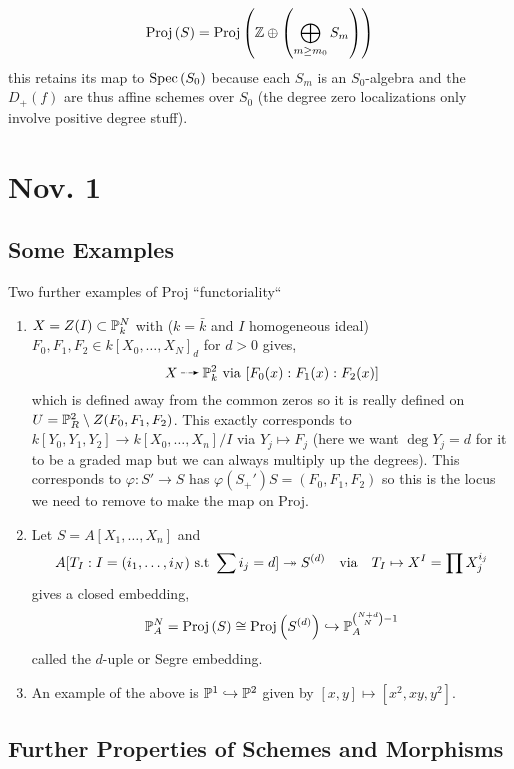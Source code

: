 \documentclass[12pt]{article}
\begin{document}
\begin{rmk}
\[ \Proj{S} =  \Proj{\Z \oplus \left( \bigoplus\limits_{m \ge m_0} S_m \right)} \]
this retains its map to $\Spec{S_0}$ because each $S_m$ is an $S_0$-algebra and the $D_+(f)$ are thus affine schemes over $S_0$ (the degree zero localizations only involve positive degree stuff).
\end{rmk}

\section{Nov. 1}

\subsection{Some Examples}

\begin{example}
Two further examples of Proj ``functoriality``
\begin{enumerate}
\item $X = Z(I) \subset \P^N_k$ with ($k = \bar{k}$ and $I$ homogeneous ideal) $F_0, F_1, F_2 \in k[X_0, \dots, X_N]_d$ for $d > 0$
gives,
\[ X \rat \P^2_k \text{ via } [F_0(x) : F_1(x) : F_2(x)] \]
which is defined away from the common zeros so it is really defined on $U = \P^2_R \setminus Z(F_0, F_1, F_2)$. This exactly corresponds to $k[Y_0, Y_1, Y_2] \to k[X_0, \dots, X_n]/I$ via $Y_j \mapsto F_j$ (here we want $\deg{Y_j} = d$ for it to be a graded map but we can always multiply up the degrees). This corresponds to $\varphi : S' \to S$ has $\varphi(S_+')S = (F_0, F_1, F_2)$ so this is the locus we need to remove to make the map on Proj. 

\item Let $S = A[X_1, \dots, X_n]$ and
\[ A[T_I : I = (i_1, \dots, i_N) \text{ s.t } \sum i_j = d] \onto S^{(d)} \quad \text{via} \quad T_I \mapsto X^I = \prod X^{i_j}_j \]
gives a closed embedding,
\[ \P^N_A = \Proj{S} \cong \Proj{S^{(d)}} \embed \P_A^{{N + d \choose N} - 1} \]
called the $d$-uple or Segre embedding.

\item An example of the above is $\P^1 \embed \P^2$ given by $[x,y] \mapsto [x^2,xy,y^2]$.
\end{enumerate}
\end{example}

\subsection{Further Properties of Schemes and Morphisms}
\end{document}
